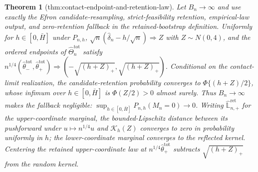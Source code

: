 \documentclass{article}
\newtheorem{theorem}{Theorem}
\begin{document}
\begin{theorem}[thm:contact-endpoint-and-retention-law]\label{thm:contact-endpoint-and-retention-law}
Let \(B_n\to\infty\) and use exactly the Efron candidate-resampling, strict-feasibility retention, empirical-law output, and zero-retention fallback in the retained-bootstrap definition. Uniformly for \(h\in[0,\bar H]\) under \(P_{n,h}\), \(\sqrt n(\widehat\delta_n-h/\sqrt n)\Rightarrow Z\) with \(Z\sim N(0,4)\), and the ordered endpoints of \(\widehat\Theta_n^{\mathrm{tot}}\) satisfy \(n^{1/4}(\widehat\theta_-^{\mathrm{tot}},\widehat\theta_+^{\mathrm{tot}})\Rightarrow(-\sqrt{(h+Z)_+},\sqrt{(h+Z)_+})\). Conditional on the contact-limit realization, the candidate-retention probability converges to \(\Phi\{(h+Z)/2\}\), whose infimum over \(h\in[0,\bar H]\) is \(\Phi(Z/2)>0\) almost surely. Thus \(B_n\to\infty\) makes the fallback negligible: \(\sup_{h\in[0,\bar H]}P_{n,h}(M_n=0)\to0\). Writing \(\widehat{\mathbb L}_{n,+}^{\mathrm{ret}}\) for the upper-coordinate marginal, the bounded-Lipschitz distance between its pushforward under \(u\mapsto n^{1/4}u\) and \(\mathcal K_h(Z)\) converges to zero in probability uniformly in \(h\); the lower-coordinate marginal converges to the reflected kernel. Centering the retained upper-coordinate law at \(n^{1/4}\widehat\theta_+^{\mathrm{tot}}\) subtracts \(\sqrt{(h+Z)_+}\) from the random kernel.
\end{theorem}
\end{document}
